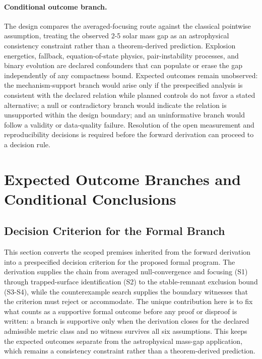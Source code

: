 \documentclass[conference]{IEEEtran}
\begin{document}
\paragraph{Conditional outcome branch.} The design compares the averaged-focusing route against the classical pointwise assumption, treating the observed 2-5 solar mass gap as an astrophysical consistency constraint rather than a theorem-derived prediction. Explosion energetics, fallback, equation-of-state physics, pair-instability processes, and binary evolution are declared confounders that can populate or erase the gap independently of any compactness bound. Expected outcomes remain unobserved: the mechanism-support branch would arise only if the prespecified analysis is consistent with the declared relation while planned controls do not favor a stated alternative; a null or contradictory branch would indicate the relation is unsupported within the design boundary; and an uninformative branch would follow a validity or data-quality failure. Resolution of the open measurement and reproducibility decisions is required before the forward derivation can proceed to a decision rule.~\cite{cite_72d7ff391b29c495,cite_7a407c865faafd11}

\section{Expected Outcome Branches and Conditional Conclusions}
\subsection{Decision Criterion for the Formal Branch}
This section converts the scoped premises inherited from the forward derivation into a prespecified decision criterion for the proposed formal program. The derivation supplies the chain from averaged null-convergence and focusing (S1) through trapped-surface identification (S2) to the stable-remnant exclusion bound (S3-S4), while the counterexample search supplies the boundary witnesses that the criterion must reject or accommodate. The unique contribution here is to fix what counts as a supportive formal outcome before any proof or disproof is written: a branch is supportive only when the derivation closes for the declared admissible metric class and no witness survives all six assumptions. This keeps the expected outcomes separate from the astrophysical mass-gap application, which remains a consistency constraint rather than a theorem-derived prediction.
\end{document}
